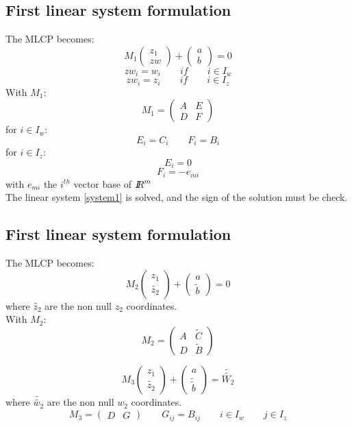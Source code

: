 \subsection{First linear system formulation}
The MLCP becomes:\\
\[\label{system1} M_{1} \left(\begin{array}{c} z_{1}\\zw \end{array}\right)+\left(\begin{array}{c} a\\b
\end{array}\right)=0 \]
\[zw_{i}=w_{i} \qquad if \qquad i \in I_{w}\]
\[zw_{i}=z_{i} \qquad if \qquad i \in I_{z}\]
With $M_{1}$:
\[M_{1}=\left(\begin{array}{cc} A&E\\D&F \end{array}\right)\]
for $i \in I_w$:
\[E_{i}=C_{i} \qquad F_{i}=B_{i} \]
for $i \in I_z$:
\[E_{i}=0 \]
\[F_{i}=-e_{mi}\]
with $e_{mi}$ the $i^{th}$ vector base of $\mbox{\rm $I\!\!R$}^m$\\
The linear system \ref{system1} is solved, and the sign of the solution must be check.
\subsection{First linear system formulation}
The MLCP becomes:\\
\[\label{system2} M_{2} \left(\begin{array}{c} z_{1}\\ \widetilde{z_{2}}
\end{array}\right)+\left(\begin{array}{c} a\\ \widetilde{b}\end{array}\right)=0 \]
where $\widetilde{z_{2}}$ are the non null $z_{2}$ coordinates.\\
With $M_{2}$:
\[M_{2}=\left(\begin{array}{cc} A&\widetilde{C}\\D&\widetilde{B} \end{array}\right)\]

\[\label{system3} M_{3} \left(\begin{array}{c} z_{1}\\ \widetilde{z_{2}}
\end{array}\right)+\left(\begin{array}{c} a\\ \widetilde{\widetilde{b}}\end{array}\right)=\widetilde{\widetilde{W_{2}}} \]
where $\widetilde{\widetilde{w_{2}}}$ are the non null $w_{2}$ coordinates.
\[M_{3}=\left(\begin{array}{cc} D&G \end{array}\right)\qquad G_{ij}=B_{ij} \qquad i \in I_{w} \qquad
j \in I_{z}\]

